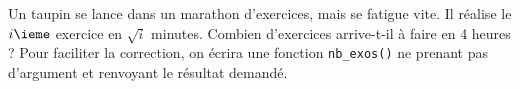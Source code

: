 
\question{} Un taupin se lance dans un marathon d'exercices, mais se fatigue vite. Il réalise le $i\ieme$ exercice en $\sqrt{i}$ minutes. Combien d'exercices arrive-t-il à faire en 4 heures ? 
Pour faciliter la correction, on écrira une fonction \texttt{nb\_exos()} ne prenant pas d'argument et renvoyant le résultat demandé.